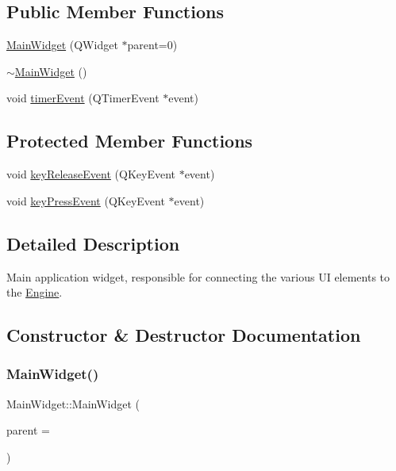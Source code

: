 \subsection*{Public Member Functions}
\begin{DoxyCompactItemize}
\item 
\hyperlink{class_main_widget_a326fee5088b7cebaa102ed5332dd59ee}{Main\+Widget} (Q\+Widget $\ast$parent=0)
\item 
\hyperlink{class_main_widget_add21c63f8e799303a21a69da3d288c2f}{$\sim$\+Main\+Widget} ()
\item 
void \hyperlink{class_main_widget_a2e776dc0a11cab27730e7b9721701a17}{timer\+Event} (Q\+Timer\+Event $\ast$event)
\end{DoxyCompactItemize}
\subsection*{Protected Member Functions}
\begin{DoxyCompactItemize}
\item 
void \hyperlink{class_main_widget_aeeec4a8f3b1948f7cb8a54832aae29df}{key\+Release\+Event} (Q\+Key\+Event $\ast$event)
\item 
void \hyperlink{class_main_widget_a28eb2faaa16c15722645d73b2c178d8f}{key\+Press\+Event} (Q\+Key\+Event $\ast$event)
\end{DoxyCompactItemize}


\subsection{Detailed Description}
Main application widget, responsible for connecting the various UI elements to the \hyperlink{class_engine}{Engine}. 

\subsection{Constructor \& Destructor Documentation}
\hypertarget{class_main_widget_a326fee5088b7cebaa102ed5332dd59ee}{}\label{class_main_widget_a326fee5088b7cebaa102ed5332dd59ee} 
\subsubsection{\texorpdfstring{Main\+Widget()}{MainWidget()}}
{\footnotesize\ttfamily Main\+Widget\+::\+Main\+Widget (\begin{DoxyParamCaption}\item[{Q\+Widget $\ast$}]{parent = {} }\end{DoxyParamCaption})\hspace{0.3cm}{\ttfamily [explicit]}}

